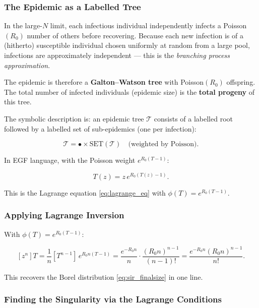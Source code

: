 \documentclass[11pt,a4paper]{article}
\theoremstyle{definition}
\begin{document}
\subsubsection{The Epidemic as a Labelled Tree}

In the large-$N$ limit, each infectious individual independently infects a
Poisson$(R_0)$ number of others before recovering. Because each new infection
is of a (hitherto) susceptible individual chosen uniformly at random from a
large pool, infections are approximately independent --- this is the
\emph{branching process approximation}.

The epidemic is therefore a \textbf{Galton--Watson tree} with Poisson$(R_0)$
offspring. The total number of infected individuals (epidemic size) is the
\textbf{total progeny} of this tree.

The symbolic description is: an epidemic tree $\mathcal{T}$ consists of a
labelled root followed by a labelled set of sub-epidemics (one per infection):

\begin{equation}
  \mathcal{T} = \bullet \times \mathrm{SET}(\mathcal{T}) \quad\text{(weighted by Poisson)}.
  \label{eq:sir_grammar}
\end{equation}

In EGF language, with the Poisson weight $e^{R_0(T-1)}$:

\begin{equation}
  T(z) = z\,e^{R_0(T(z) - 1)}.
  \label{eq:sir_lagrange2}
\end{equation}

This is the Lagrange equation \eqref{eq:lagrange_eq} with $\phi(T) = e^{R_0(T-1)}$.

\subsubsection{Applying Lagrange Inversion}

With $\phi(T) = e^{R_0(T-1)}$:

\[
  [z^n]T = \frac{1}{n}[T^{n-1}]\,e^{R_0 n(T-1)}
          = \frac{e^{-R_0 n}}{n}\cdot\frac{(R_0 n)^{n-1}}{(n-1)!}
          = \frac{e^{-R_0 n}(R_0 n)^{n-1}}{n!}.
\]

This recovers the Borel distribution \eqref{eq:sir_finalsize} in one line.

\subsubsection{Finding the Singularity via the Lagrange Conditions}
\end{document}
